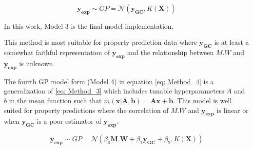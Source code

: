 \documentclass[journal=jacsat,manuscript=article]{achemso}
\begin{document}
\begin{equation}
    \mathbf{y_{\text{exp}}} \sim  GP = \mathcal{N}\left(\mathbf{y_{GC}}, K(\mathbf{X}) \right)
    \label{eq: Method_3}
\end{equation}

In this work, Model 3 is the final model implementation. 

This method is most suitable for property prediction data where $\mathbf{y_{GC}}$ is at least a somewhat faithful representation of $\mathbf{y_{\text{exp}}}$ and the relationship between $M.W$ and $\mathbf{y_{\text{exp}}}$ is unknown. 

The fourth GP model form (Model 4) in equation \ref{eq: Method_4} is a generalization of \ref{eq: Method_3} which includes tunable hyperparameters $A$ and $b$ in the mean function such that $m(\mathbf{x} \vert \mathbf{A},\mathbf{b}) = \mathbf{A}\mathbf{x} + \mathbf{b}$. This model is well suited for property predictions where the correlation of $M.W$ and $\mathbf{y_{\text{exp}}}$ is linear or when $\mathbf{y_{GC}}$ is a poor estimator of $\mathbf{y_{\text{exp}}}$. 

\begin{equation}
    \mathbf{y_{\text{exp}}} \sim GP = \mathcal{N}\left( \beta_{0} \mathbf{M.W} + \beta_{1} \mathbf{y_{GC}} +\beta_{2} , K(\mathbf{X}) \right)
    \label{eq: Method_4}
\end{equation}


\end{document}
